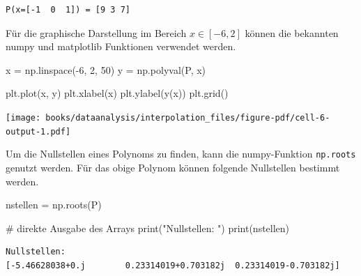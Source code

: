 \documentclass[
  letterpaper,
  DIV=11,
  numbers=noendperiod]{scrreprt}
\newenvironment{Shaded}{\begin{snugshade}}{\end{snugshade}}
\newcommand{\BuiltInTok}[1]{\textcolor[rgb]{0.00,0.23,0.31}{#1}}
\newcommand{\CommentTok}[1]{\textcolor[rgb]{0.37,0.37,0.37}{#1}}
\newcommand{\DecValTok}[1]{\textcolor[rgb]{0.68,0.00,0.00}{#1}}
\newcommand{\NormalTok}[1]{\textcolor[rgb]{0.00,0.23,0.31}{#1}}
\newcommand{\OperatorTok}[1]{\textcolor[rgb]{0.37,0.37,0.37}{#1}}
\newcommand{\StringTok}[1]{\textcolor[rgb]{0.13,0.47,0.30}{#1}}
\begin{document}
\begin{verbatim}
P(x=[-1  0  1]) = [9 3 7]
\end{verbatim}

Für die graphische Darstellung im Bereich \(x \in [-6, 2]\) können die
bekannten numpy und matplotlib Funktionen verwendet werden.

\begin{Shaded}
\begin{Highlighting}[]
\NormalTok{x }\OperatorTok{=}\NormalTok{ np.linspace(}\OperatorTok{{-}}\DecValTok{6}\NormalTok{, }\DecValTok{2}\NormalTok{, }\DecValTok{50}\NormalTok{)}
\NormalTok{y }\OperatorTok{=}\NormalTok{ np.polyval(P, x)}

\NormalTok{plt.plot(x, y)}
\NormalTok{plt.xlabel(}\StringTok{\textquotesingle{}x\textquotesingle{}}\NormalTok{)}
\NormalTok{plt.ylabel(}\StringTok{\textquotesingle{}y(x)\textquotesingle{}}\NormalTok{)}
\NormalTok{plt.grid()}
\end{Highlighting}
\end{Shaded}

\texttt{[image: books/dataanalysis/interpolation\_files/figure-pdf/cell-6-output-1.pdf]}

Um die Nullstellen eines Polynoms zu finden, kann die numpy-Funktion
\texttt{np.roots} genutzt werden. Für das obige Polynom können folgende
Nullstellen bestimmt werden.

\begin{Shaded}
\begin{Highlighting}[]
\NormalTok{nstellen }\OperatorTok{=}\NormalTok{ np.roots(P)}

\CommentTok{\# direkte Ausgabe des Arrays}
\BuiltInTok{print}\NormalTok{(}\StringTok{"Nullstellen: "}\NormalTok{)}
\BuiltInTok{print}\NormalTok{(nstellen)}
\end{Highlighting}
\end{Shaded}

\begin{verbatim}
Nullstellen: 
[-5.46628038+0.j        0.23314019+0.703182j  0.23314019-0.703182j]
\end{verbatim}
\end{document}
